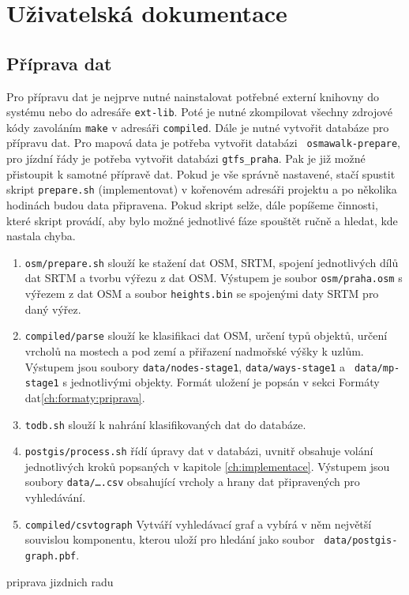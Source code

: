 \chapter{Uživatelská dokumentace}
\section{Příprava dat}
Pro přípravu dat je nejprve nutné nainstalovat potřebné externí knihovny do
systému nebo do adresáře {\tt ext-lib}. Poté je nutné zkompilovat všechny zdrojové
kódy zavoláním {\tt make} v adresáři {\tt compiled}. Dále je nutné vytvořit databáze
pro přípravu dat. Pro mapová data je potřeba vytvořit databázi {\tt
osmawalk-prepare},
pro jízdní řády je potřeba vytvořit databázi {\tt gtfs\_praha}. Pak je již možné
přistoupit k samotné přípravě dat. Pokud je vše správně nastavené, stačí spustit
skript {\tt prepare.sh} (\TODO implementovat) v kořenovém adresáři projektu a po několika hodinách
budou data připravena. Pokud skript selže, dále popíšeme činnosti, které skript
provádí, aby bylo možné jednotlivé fáze spouštět ručně a hledat, kde nastala chyba.

\begin{enumerate}
\item {\tt osm/prepare.sh} slouží ke stažení dat OSM, SRTM, spojení jednotlivých
dílů dat SRTM a tvorbu výřezu z dat OSM. Výstupem je soubor {\tt osm/praha.osm}
s výřezem z dat OSM a soubor {\tt heights.bin} se spojenými daty SRTM pro daný
výřez. 
\item {\tt compiled/parse} slouží ke klasifikaci dat OSM, určení typů objektů,
určení vrcholů na mostech a pod zemí a přiřazení nadmořské výšky k uzlům.
Výstupem jsou soubory {\tt data/nodes-stage1}, {\tt data/ways-stage1} a {\tt
data/mp-stage1} s jednotlivými objekty. Formát uložení je popsán v sekci Formáty
dat\ref{ch:formaty:priprava}.
\item {\tt todb.sh} slouží k nahrání klasifikovaných dat do databáze. 
\item {\tt postgis/process.sh} řídí úpravy dat v databázi, uvnitř obsahuje
volání jednotlivých kroků popsaných v kapitole \ref{ch:implementace}.
Výstupem jsou soubory {\tt data/\dots.csv} obsahující vrcholy a hrany dat
připravených pro vyhledávání. 
\item {\tt compiled/csvtograph} Vytváří vyhledávací graf a vybírá v něm největší
souvislou komponentu, kterou uloží pro hledání jako soubor {\tt
data/postgis-graph.pbf}.
\end{enumerate}
\TODO priprava jizdnich radu

